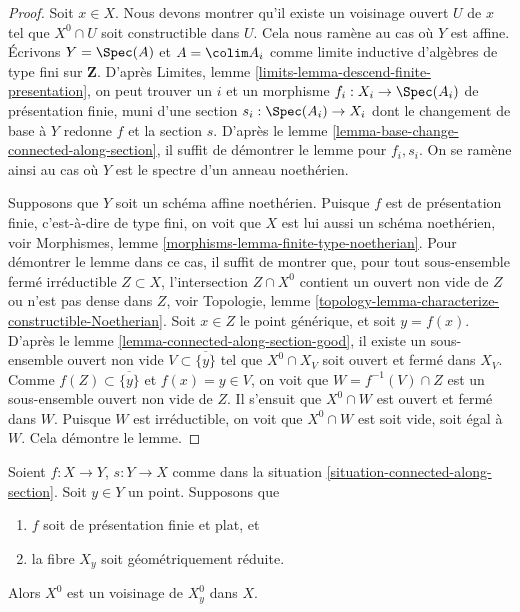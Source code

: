 \begin{proof}
Soit $x \in X$. Nous devons montrer qu'il existe un voisinage ouvert
$U$ de $x$ tel que $X^0 \cap U$ soit constructible dans $U$.
Cela nous ramène au cas où $Y$ est affine.
Écrivons $Y = \Spec(A)$ et $A = \colim A_i$ comme limite
inductive d'algèbres de type fini sur $\mathbf{Z}$. D'après
Limites, lemme \ref{limits-lemma-descend-finite-presentation},
on peut trouver un $i$ et un morphisme $f_i : X_i \to \Spec(A_i)$ de
présentation finie, muni d'une section $s_i : \Spec(A_i) \to X_i$
dont le changement de base à $Y$ redonne $f$ et la section $s$. D'après le
lemme \ref{lemma-base-change-connected-along-section},
il suffit de démontrer le lemme pour $f_i, s_i$. On se ramène ainsi au
cas où $Y$ est le spectre d'un anneau noethérien.

\medskip\noindent
Supposons que $Y$ soit un schéma affine noethérien. Puisque $f$ est de présentation finie,
c'est-à-dire de type fini, on voit que $X$ est lui aussi un schéma noethérien, voir
Morphismes, lemme \ref{morphisms-lemma-finite-type-noetherian}.
Pour démontrer le lemme dans
ce cas, il suffit de montrer que, pour tout sous-ensemble fermé irréductible
$Z \subset X$, l'intersection $Z \cap X^0$ contient un ouvert non vide
de $Z$ ou n'est pas dense dans $Z$, voir
Topologie, lemme \ref{topology-lemma-characterize-constructible-Noetherian}.
Soit $x \in Z$ le point générique, et soit $y = f(x)$. D'après le
lemme \ref{lemma-connected-along-section-good},
il existe un sous-ensemble ouvert non vide $V \subset \overline{\{y\}}$ tel
que $X^0 \cap X_V$ soit ouvert et fermé dans $X_V$. Comme
$f(Z) \subset \overline{\{y\}}$ et $f(x) = y \in V$, on voit que
$W = f^{-1}(V) \cap Z$ est un sous-ensemble ouvert non vide de $Z$. Il s'ensuit que
$X^0 \cap W$ est ouvert et fermé dans $W$. Puisque $W$ est irréductible,
on voit que $X^0 \cap W$ est soit vide, soit égal à $W$.
Cela démontre le lemme.
\end{proof}

\begin{lemma}
\label{lemma-connected-along-section-open-neighbourhood}
Soient $f : X \to Y$, $s : Y \to X$ comme dans la
situation \ref{situation-connected-along-section}.
Soit $y \in Y$ un point.
Supposons que
\begin{enumerate}
\item $f$ soit de présentation finie et plat, et
\item la fibre $X_y$ soit géométriquement réduite.
\end{enumerate}
Alors $X^0$ est un voisinage de $X^0_y$ dans $X$.
\end{lemma}

